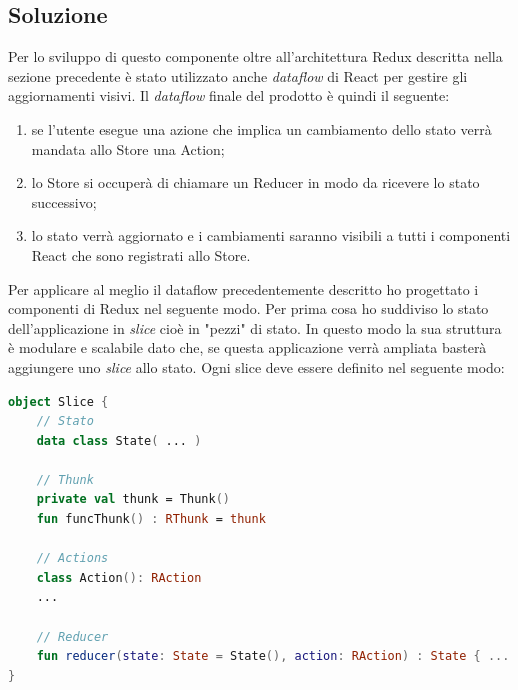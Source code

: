 \subsection{Soluzione}
Per lo sviluppo di questo componente oltre all'architettura Redux descritta nella sezione precedente è stato utilizzato anche \emph{dataflow} di React per gestire gli aggiornamenti visivi. Il \emph{dataflow} finale del prodotto è quindi il seguente:
\begin{enumerate}
	\item se l'utente esegue una azione che implica un cambiamento dello stato verrà mandata allo Store una Action;
	\item lo Store si occuperà di chiamare un Reducer in modo da ricevere lo stato successivo;
	\item lo stato verrà aggiornato e i cambiamenti saranno visibili a tutti i componenti React che sono registrati allo Store.
\end{enumerate}
Per applicare al meglio il dataflow precedentemente descritto ho progettato i componenti di Redux nel seguente modo. Per prima cosa ho suddiviso lo stato dell'applicazione in \emph{slice} cioè in "pezzi" di stato. In questo modo la sua struttura è modulare e scalabile dato che, se questa applicazione verrà ampliata basterà aggiungere uno \emph{slice} allo stato. Ogni slice deve essere definito nel seguente modo:
\begin{lstlisting}[caption={Esempio Slice}, label={lst:bodycells}, language=Kotlin]
object Slice {
	// Stato
	data class State( ... )
	
	// Thunk
	private val thunk = Thunk()
	fun funcThunk() : RThunk = thunk
	
	// Actions
	class Action(): RAction
	...
	
	// Reducer
	fun reducer(state: State = State(), action: RAction) : State { ... }
}
\end{lstlisting}

